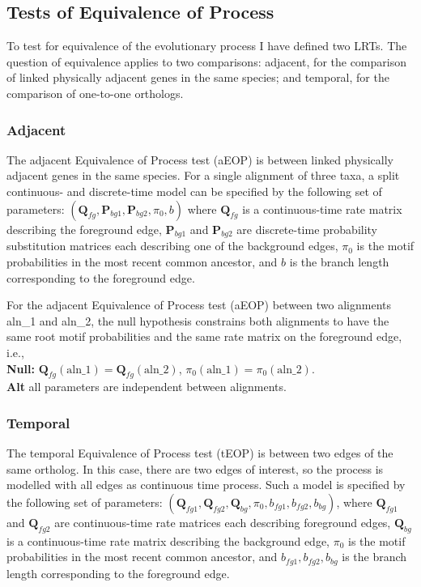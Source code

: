 

\subsection{Tests of Equivalence of Process}
\label{Tests of Equivalence of Process}
To test for equivalence of the evolutionary process I have defined two LRTs. The question of equivalence applies to two comparisons: adjacent, for the comparison of linked physically adjacent genes in the same species; and temporal, for the comparison of one-to-one orthologs.

\subsubsection{Adjacent }

The adjacent Equivalence of Process test (aEOP) is between linked physically adjacent genes in the same species. For a single alignment of three taxa, a split continuous- and discrete-time model can be specified by the following set of parameters: $( \bm{Q}_{fg}, \bm{P}_{bg1}, \bm{P}_{bg2}, \pi_{0}, b ) $ where $\bm{Q}_{fg}$ is a continuous-time rate matrix describing the foreground edge,  $\bm{P}_{bg1}$ and $\bm{P}_{bg2}$ are discrete-time probability substitution matrices each describing one of the background edges, $\pi_{0}$ is the motif probabilities in the most recent common ancestor, and $b$ is the branch length corresponding to the foreground edge. 

For the adjacent Equivalence of Process test (aEOP) between two alignments aln\_1 and aln\_2, the null hypothesis constrains both alignments to have the same root motif probabilities and the same rate matrix on the foreground edge, i.e.,  \\
\textbf{Null:} $\bm{Q}_{fg}(\text{aln\_1}) = \bm{Q}_{fg}(\text{aln\_2})$,  $\pi_0(\text{aln\_1}) = \pi_0(\text{aln\_2})$. \\
\textbf{Alt} all parameters are independent between alignments. 

\subsubsection{Temporal }

The temporal Equivalence of Process test (tEOP) is between two edges of the same ortholog. In this case, there are two edges of interest, so the process is modelled with all edges as continuous time process. Such a model is specified by the following set of parameters: $( \bm{Q}_{fg1}, \bm{Q}_{fg2}, \bm{Q}_{bg}, \pi_{0}, b_{fg1}, b_{fg2}, b_{bg}) $, where $\bm{Q}_{fg1}$ and $\bm{Q}_{fg2}$ are continuous-time rate matrices each describing foreground edges,  $\bm{Q}_{bg}$ is a continuous-time rate matrix describing the background edge, $\pi_{0}$ is the motif probabilities in the most recent common ancestor, and $ b_{fg1}, b_{fg2}, b_{bg}$ is the branch length corresponding to the foreground edge. 

